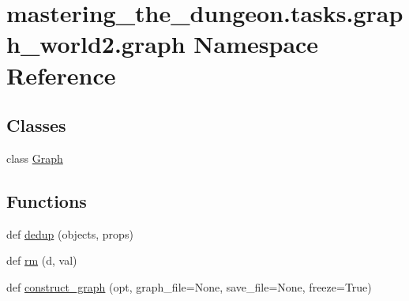 \hypertarget{namespacemastering__the__dungeon_1_1tasks_1_1graph__world2_1_1graph}{}\section{mastering\+\_\+the\+\_\+dungeon.\+tasks.\+graph\+\_\+world2.\+graph Namespace Reference}
\label{namespacemastering__the__dungeon_1_1tasks_1_1graph__world2_1_1graph}
\subsection*{Classes}
\begin{DoxyCompactItemize}
\item 
class \hyperlink{classmastering__the__dungeon_1_1tasks_1_1graph__world2_1_1graph_1_1Graph}{Graph}
\end{DoxyCompactItemize}
\subsection*{Functions}
\begin{DoxyCompactItemize}
\item 
def \hyperlink{namespacemastering__the__dungeon_1_1tasks_1_1graph__world2_1_1graph_aa43376207c15bbdff5b5e8c1dd48b59a}{dedup} (objects, props)
\item 
def \hyperlink{namespacemastering__the__dungeon_1_1tasks_1_1graph__world2_1_1graph_a87e8d1d45f16bc53d3e994900560c716}{rm} (d, val)
\item 
def \hyperlink{namespacemastering__the__dungeon_1_1tasks_1_1graph__world2_1_1graph_a028692716d5f060d74a3ccdefa42e183}{construct\+\_\+graph} (opt, graph\+\_\+file=None, save\+\_\+file=None, freeze=True)
\end{DoxyCompactItemize}
